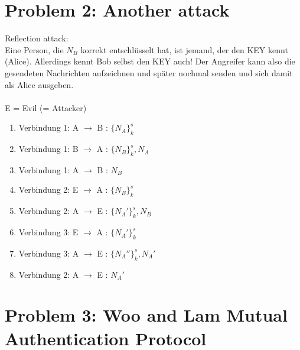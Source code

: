 \documentclass[12pt,pdftex,a4paper]{article}
\newcommand\tab[1][1cm]{\hspace*{#1}}
\begin{document}
\section*{Problem 2: Another attack}
Reflection attack:\\
Eine Person, die $ N_B $ korrekt entschlüsselt hat, ist jemand, der den KEY kennt (Alice). Allerdings kennt Bob selbst den KEY auch! Der Angreifer kann also die gesendeten Nachrichten aufzeichnen und später nochmal senden und sich damit als Alice ausgeben.
\\~\\
E = Evil (= Attacker)
\begin{enumerate}
	\item Verbindung 1: A $ \rightarrow $ B \tab : $ \{N_A\}^s_k $
	\item Verbindung 1: B $ \rightarrow $ A \tab : $ \{N_B\}^s_k, N_A $
	\item Verbindung 1: A $ \rightarrow $ B \tab : $ N_B $
	\setlength{\itemsep}{20pt}
	\item Verbindung 2: E $ \rightarrow $ A \tab : $ \{N_B\}^s_k $
	\setlength{\itemsep}{5pt}
	\item Verbindung 2: A $ \rightarrow $ E \tab : $ \{N_A'\}^s_k, N_B $
	\item Verbindung 3: E $ \rightarrow $ A \tab : $ \{N_A'\}^s_k $
	\item Verbindung 3: A $ \rightarrow $ E \tab : $ \{N_A''\}^s_k, N_A' $
	\item Verbindung 2: A $ \rightarrow $ E \tab : $ N_A' $
\end{enumerate}
\section*{Problem 3: Woo and Lam Mutual Authentication Protocol}
\end{document}
